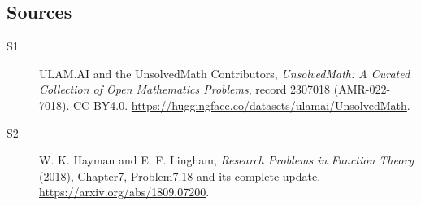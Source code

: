 \documentclass[11pt]{article}
\begin{document}
\subsection{Sources}
\begin{description}
\item[\hypertarget{source:2307018:1}{S1}] ULAM.AI and the UnsolvedMath Contributors, \emph{UnsolvedMath: A Curated Collection of Open Mathematics Problems}, record 2307018 (AMR-022-7018). CC BY4.0. \url{https://huggingface.co/datasets/ulamai/UnsolvedMath}.
\item[\hypertarget{source:2307018:2}{S2}] W. K. Hayman and E. F. Lingham, \emph{Research Problems in Function Theory} (2018), Chapter7, Problem7.18 and its complete update. \url{https://arxiv.org/abs/1809.07200}.
\end{description}
\label{end:2307018}
\end{document}
